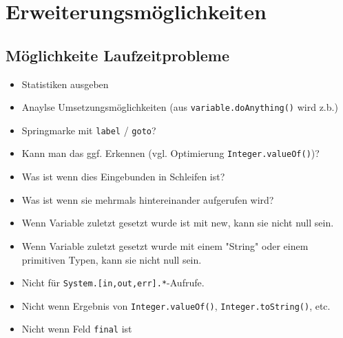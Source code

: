 
\chapter{Erweiterungsmöglichkeiten}

\section{Möglichkeite Laufzeitprobleme}


\begin{itemize}
\item Statistiken ausgeben
\item Anaylse Umsetzungsmöglichkeiten (aus \texttt{variable.doAnything()} wird z.b.)
\item Springmarke mit \texttt{label} / \texttt{goto}?
\item Kann man das ggf. Erkennen (vgl. Optimierung \texttt{Integer.valueOf()})?
\item Was ist wenn dies Eingebunden in Schleifen ist?
\item Was ist wenn sie mehrmals hintereinander aufgerufen wird?
\item Wenn Variable zuletzt gesetzt wurde ist mit new, kann sie nicht null sein.
\item Wenn Variable zuletzt gesetzt wurde mit einem "String" oder einem primitiven Typen, kann sie nicht null sein.
\item Nicht für \texttt{System.[in,out,err].*}-Aufrufe.
\item Nicht wenn Ergebnis von \texttt{Integer.valueOf()}, \texttt{Integer.toString()}, etc.
\item Nicht wenn Feld \texttt{final} ist
\end{itemize}

